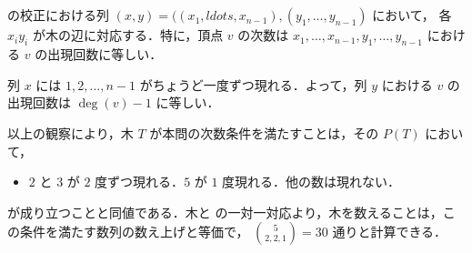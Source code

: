 \subsection{}
\prufer の校正における列 $(x,y) = ((x_1,ldots,x_{n-1}), (y_1,\ldots,y_{n-1})$ において，
各 $x_iy_i$ が木の辺に対応する．特に，頂点 $v$ の次数は $x_1,\ldots, x_{n-1}, y_1, \ldots, y_{n-1}$ における
$v$ の出現回数に等しい．

列 $x$ には $1,2,\ldots, n-1$ がちょうど一度ずつ現れる．よって，列 $y$ における $v$ の出現回数は $\deg(v) - 1$ に等しい．

以上の観察により，木 $T$ が本問の次数条件を満たすことは，その \prufer $P(T)$ において，
\begin{itemize}
 \item $2$ と $3$ が $2$ 度ずつ現れる．$5$ が $1$ 度現れる．他の数は現れない．
\end{itemize}
が成り立つことと同値である．木と \prufer の一対一対応より，木を数えることは，この条件を満たす数列の数え上げと等価で，
$\binom{5}{2,2,1} = 30$ 通りと計算できる．
